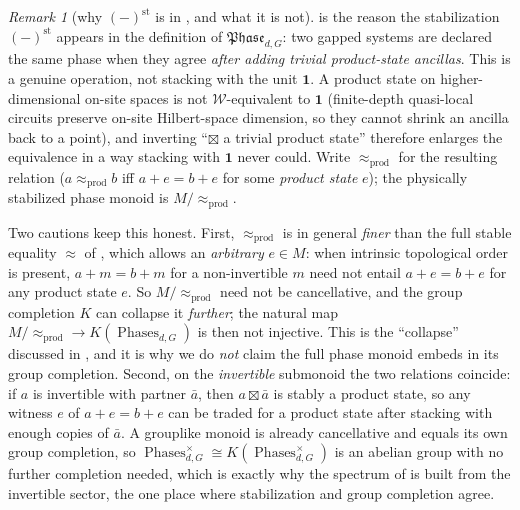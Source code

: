 \documentclass[12pt]{article}
\newcommand{\Phase}{\mathfrak{Phase}}          %
\newcommand{\Phases}{\operatorname{Phases}}    %
\newcommand{\Weq}{\mathcal{W}}                 %
\newcommand{\st}{\mathrm{st}}                  %
\newcommand{\Groth}{K}                       %
\newcommand{\triv}{\mathbf{1}}               %
\theoremstyle{definition}
\theoremstyle{remark}
\newtheorem{remark}[remark]{Remark}
\theoremstyle{plain}
\begin{document}
\begin{remark}[why $(-)^{\st}$ is in , and what it is not]
\label{rem:stmeaning}
 is the reason the stabilization $(-)^{\st}$ appears in the
definition of $\Phase_{d,G}$: two gapped systems are declared the same phase when
they agree \emph{after adding trivial product-state ancillas}. This is a genuine
operation, not stacking with the unit $\triv$. A product state on
higher-dimensional on-site spaces is not $\Weq$-equivalent to $\triv$ (finite-depth
quasi-local circuits preserve on-site Hilbert-space dimension, so they cannot
shrink an ancilla back to a point), and inverting ``$\boxtimes$ a trivial product
state'' therefore enlarges the equivalence in a way stacking with $\triv$ never
could. Write $\approx_{\mathrm{prod}}$ for the resulting relation
($a\approx_{\mathrm{prod}}b$ iff $a+e=b+e$ for some \emph{product state} $e$); the
physically stabilized phase monoid is $M/{\approx_{\mathrm{prod}}}$.

Two cautions keep this honest. First, $\approx_{\mathrm{prod}}$ is in general
\emph{finer} than the full stable equality $\approx$ of , which
allows an \emph{arbitrary} $e\in M$: when intrinsic topological order is present,
$a+m=b+m$ for a non-invertible $m$ need not entail $a+e=b+e$ for any product
state $e$. So $M/{\approx_{\mathrm{prod}}}$ need not be cancellative, and the
group completion $\Groth$ can collapse it \emph{further}; the natural map
$M/{\approx_{\mathrm{prod}}}\to\Groth(\Phases_{d,G})$ is then not injective. This
is the ``collapse'' discussed in , and it is why we do
\emph{not} claim the full phase monoid embeds in its group completion. Second, on
the \emph{invertible} submonoid the two relations coincide: if $a$ is invertible
with partner $\bar a$, then $a\boxtimes\bar a$ is stably a product state, so any
witness $e$ of $a+e=b+e$ can be traded for a product state after stacking with
enough copies of $\bar a$. A grouplike monoid is already cancellative and equals
its own group completion, so
$\Phases_{d,G}^{\times}\cong\Groth(\Phases_{d,G}^{\times})$ is an abelian group
with no further completion needed, which is exactly why the spectrum of
 is built from the invertible sector, the one place where
stabilization and group completion agree.
\end{remark}
\end{document}
